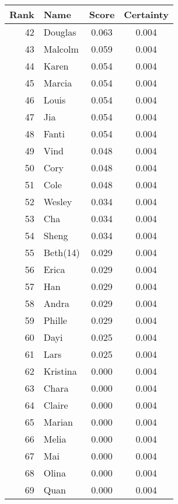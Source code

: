 \documentclass{icmmcm}
\begin{document}
\begin{table}[h!]
\begin{center}
\begin{tabular}{|@{}r@{}||l|c|@{}c@{}|} 
\toprule
 Rank 	&     Name    	&Score    &Certainty \\ 
\midrule   
\hline
42   	&Douglas      	& 0.063	&    0.004\\
43   	&Malcolm      	& 0.059	&    0.004\\
44   	&Karen        	& 0.054	&    0.004\\
45   	&Marcia       	& 0.054	&    0.004\\
46   	&Louis        	& 0.054	&    0.004\\
47   	&Jia          	& 0.054	&    0.004\\
48   	&Fanti        	& 0.054	&    0.004\\
49   	&Vind         	& 0.048	&    0.004\\
50   	&Cory         	& 0.048	&    0.004\\
51   	&Cole         	& 0.048	&    0.004\\
52   	&Wesley       	& 0.034	&    0.004\\
53   	&Cha          	& 0.034	&    0.004\\
54   	&Sheng        	& 0.034	&    0.004\\
55   	&Beth(14)     	& 0.029	&    0.004\\
56   	&Erica        	& 0.029	&    0.004\\
57   	&Han          	& 0.029	&    0.004\\
58   	&Andra        	& 0.029	&    0.004\\
59   	&Phille       	& 0.029	&    0.004\\
60   	&Dayi         	& 0.025	&    0.004\\
61   	&Lars         	& 0.025	&    0.004\\
62   	&Kristina     	& 0.000	&    0.004\\
63   	&Chara        	& 0.000	&    0.004\\
64   	&Claire       	& 0.000	&    0.004\\
65   	&Marian       	& 0.000	&    0.004\\
66   	&Melia        	& 0.000	&    0.004\\
67   	&Mai          	& 0.000	&    0.004\\
68   	&Olina        	& 0.000	&    0.004\\
69   	&Quan         	& 0.000	&    0.004\\

\end{tabular}
\end{center}
\end{table}
\end{document}
